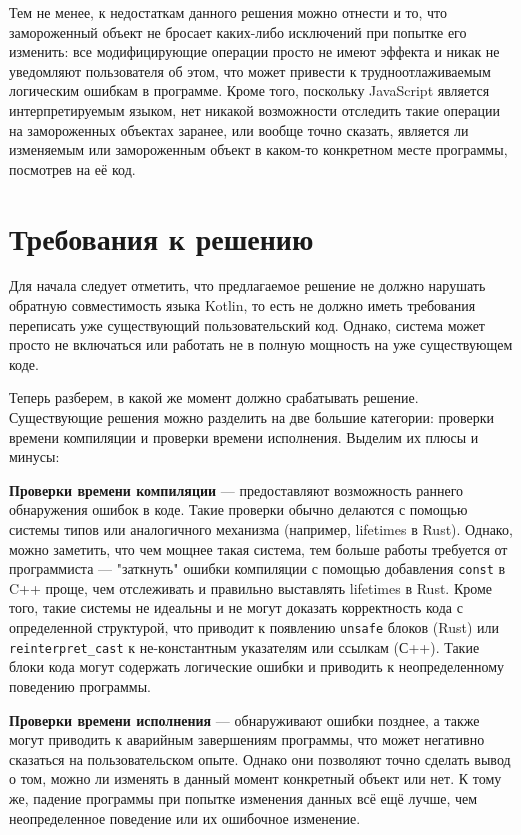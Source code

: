 \documentclass[specification,annotation,times]{itmo-student-thesis}
\begin{document}
Тем не менее, к недостаткам данного решения можно отнести и то, что замороженный объект не бросает каких-либо исключений при попытке его изменить:
все модифицирующие операции просто не имеют эффекта и никак не уведомляют пользователя об этом, что может привести к трудноотлаживаемым логическим ошибкам в программе.
Кроме того, поскольку JavaScript является интерпретируемым языком, нет никакой возможности отследить такие операции на замороженных объектах заранее, или вообще точно сказать, является ли изменяемым или замороженным объект в каком-то конкретном месте программы, посмотрев на её код.

\section{Требования к решению}

Для начала следует отметить, что предлагаемое решение не должно нарушать обратную совместимость языка Kotlin, то есть не должно иметь требования переписать уже существующий пользовательский код. Однако, система может просто не включаться или работать не в полную мощность на уже существующем коде.

Теперь разберем, в какой же момент должно срабатывать решение. Существующие решения можно разделить на две большие категории: проверки времени компиляции и проверки времени исполнения.
Выделим их плюсы и минусы:

\textbf{Проверки времени компиляции} --- предоставляют возможность раннего обнаружения ошибок в коде. Такие проверки обычно делаются с помощью системы типов или аналогичного механизма (например, lifetimes в Rust).
Однако, можно заметить, что чем мощнее такая система, тем больше работы требуется от программиста --- "заткнуть" ошибки компиляции с помощью добавления \texttt{const} в C++ проще, чем отслеживать и правильно выставлять lifetimes в Rust.
Кроме того, такие системы не идеальны и не могут доказать корректность кода с определенной структурой, что приводит к появлению \texttt{unsafe} блоков (Rust) или \texttt{reinterpret\_cast} к не-константным указателям или ссылкам (С++).
Такие блоки кода могут содержать логические ошибки и приводить к неопределенному поведению программы.

\textbf{Проверки времени исполнения} --- обнаруживают ошибки позднее, а также могут приводить к аварийным завершениям программы, что может негативно сказаться на пользовательском опыте.
Однако они позволяют точно сделать вывод о том, можно ли изменять в данный момент конкретный объект или нет.
К тому же, падение программы при попытке изменения данных всё ещё лучше, чем неопределенное поведение или их ошибочное изменение.  
\end{document}
